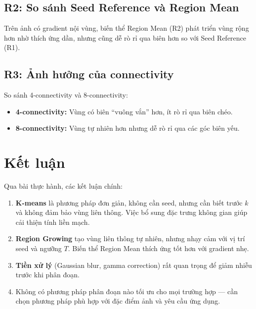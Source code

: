 \documentclass[12pt,a4paper]{article}
\begin{document}
\subsection{R2: So sánh Seed Reference và Region Mean}

Trên ảnh có gradient nội vùng, biến thể Region Mean (R2) phát triển vùng rộng hơn nhờ thích ứng dần, nhưng cũng dễ rò rỉ qua biên hơn so với Seed Reference (R1).

\subsection{R3: Ảnh hưởng của connectivity}

So sánh 4-connectivity và 8-connectivity:
\begin{itemize}
    \item \textbf{4-connectivity:} Vùng có biên ``vuông vắn'' hơn, ít rò rỉ qua biên chéo.
    \item \textbf{8-connectivity:} Vùng tự nhiên hơn nhưng dễ rò rỉ qua các góc biên yếu.
\end{itemize}

\section{Kết luận}

Qua bài thực hành, các kết luận chính:

\begin{enumerate}
    \item \textbf{K-means} là phương pháp đơn giản, không cần seed, nhưng cần biết trước $k$ và không đảm bảo vùng liên thông. Việc bổ sung đặc trưng không gian giúp cải thiện tính liền mạch.
    \item \textbf{Region Growing} tạo vùng liên thông tự nhiên, nhưng nhạy cảm với vị trí seed và ngưỡng $T$. Biến thể Region Mean thích ứng tốt hơn với gradient nhẹ.
    \item \textbf{Tiền xử lý} (Gaussian blur, gamma correction) rất quan trọng để giảm nhiễu trước khi phân đoạn.
    \item Không có phương pháp phân đoạn nào tối ưu cho mọi trường hợp --- cần chọn phương pháp phù hợp với đặc điểm ảnh và yêu cầu ứng dụng.
\end{enumerate}
\end{document}
